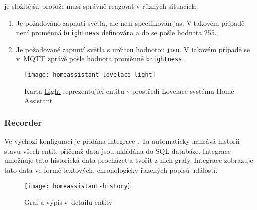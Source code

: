  je složitější, protože musí správně reagovat
v různých situacích:
\begin{enumerate}[nosep]
    \item Je požadováno zapnutí světla, ale není specifikován jas. V takovém
        případě není proměnná \texttt{brightness} definována a do
         se pošle hodnota \num{255}.
    \item Je požadované zapnutí světla s určitou hodnotou jasu. V takovém
        případě se v~MQTT zprávě pošle hodnota proměnné \texttt{brightness}.
\end{enumerate}

\begin{figure}[htb]
    \centering
    \texttt{[image: homeassistant-lovelace-light]}
    \caption{%
        Karta \href{https://www.home-assistant.io/lovelace/light/}{Light}
        reprezentující entitu  v prostředí
        Lovelace systému Home Assistant
    }
    \label{fig:homeassistant lovelace light}
\end{figure}


\subsubsection{Recorder}
Ve výchozí konfiguraci je přidána integrace . Ta
automaticky nahrává historii stavu všech entit, přičemž data jsou ukládána do
SQL databáze. Integrace  umožňuje tato historická data
procházet a tvořit z nich grafy. Integrace  zobrazuje
tato data ve formě textových, chronologicky řazených popisů událostí.

\begin{figure}[htb]
    \centering
    \texttt{[image: homeassistant-history]}
    \caption{%
        Graf  a výpis  v~detailu
        entity 
    }
    \label{fig:homeassistant lovelace light history}
\end{figure}



